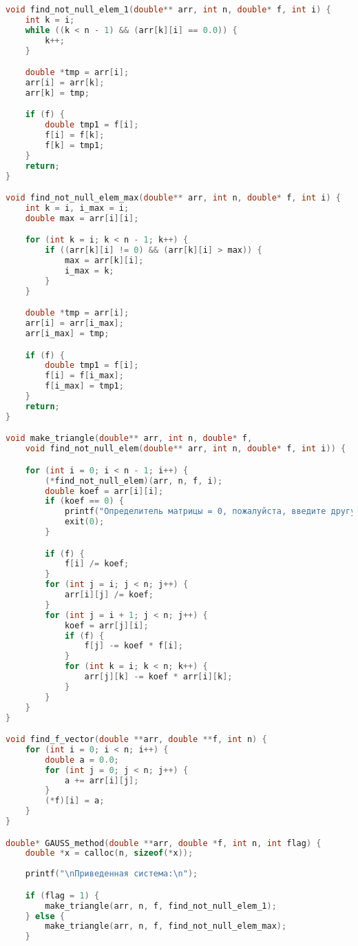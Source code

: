 \documentclass[a4paper,12pt,titlepage,finall]{article}
\begin{document}
\begin{lstlisting}[language=C, caption=main.c]
void find_not_null_elem_1(double** arr, int n, double* f, int i) {
    int k = i;
    while ((k < n - 1) && (arr[k][i] == 0.0)) {
        k++;
    }

    double *tmp = arr[i];
    arr[i] = arr[k];
    arr[k] = tmp;

    if (f) {
        double tmp1 = f[i];
        f[i] = f[k];
        f[k] = tmp1;
    }
    return;
}

void find_not_null_elem_max(double** arr, int n, double* f, int i) {
    int k = i, i_max = i;
    double max = arr[i][i];

    for (int k = i; k < n - 1; k++) {
        if ((arr[k][i] != 0) && (arr[k][i] > max)) {
            max = arr[k][i];
            i_max = k;
        }
    }

    double *tmp = arr[i];
    arr[i] = arr[i_max];
    arr[i_max] = tmp;

    if (f) {
        double tmp1 = f[i];
        f[i] = f[i_max];
        f[i_max] = tmp1;
    }
    return;
}

void make_triangle(double** arr, int n, double* f,
    void find_not_null_elem(double** arr, int n, double* f, int i)) {

    for (int i = 0; i < n - 1; i++) {
        (*find_not_null_elem)(arr, n, f, i);
        double koef = arr[i][i];
        if (koef == 0) {
            printf("Определитель матрицы = 0, пожалуйста, введите другую матрицу\n");
            exit(0);
        }

        if (f) {
            f[i] /= koef;
        }
        for (int j = i; j < n; j++) {
            arr[i][j] /= koef;
        }
        for (int j = i + 1; j < n; j++) {
            koef = arr[j][i];
            if (f) {
                f[j] -= koef * f[i];
            }
            for (int k = i; k < n; k++) {
                arr[j][k] -= koef * arr[i][k];
            }
        }
    }
}

void find_f_vector(double **arr, double **f, int n) {
    for (int i = 0; i < n; i++) {
        double a = 0.0;
        for (int j = 0; j < n; j++) {
            a += arr[i][j];
        }
        (*f)[i] = a;
    }
}

double* GAUSS_method(double **arr, double *f, int n, int flag) {
    double *x = calloc(n, sizeof(*x));
    
    printf("\nПриведенная система:\n");

    if (flag = 1) {
        make_triangle(arr, n, f, find_not_null_elem_1);
    } else {
        make_triangle(arr, n, f, find_not_null_elem_max);
    }


\end{lstlisting}
\end{document}
